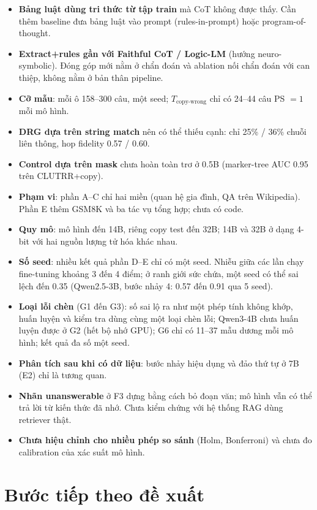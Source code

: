 \documentclass[11pt]{article}
\begin{document}
\begin{itemize}[leftmargin=*,itemsep=1pt]
\item \textbf{Bảng luật dùng tri thức từ tập train} mà CoT không được thấy. Cần thêm baseline đưa
  bảng luật vào prompt (rules-in-prompt) hoặc program-of-thought.
\item \textbf{Extract+rules gần với Faithful CoT / Logic-LM} (hướng neuro-symbolic). Đóng góp mới
  nằm ở chẩn đoán và ablation nối chẩn đoán với can thiệp, không nằm ở bản thân pipeline.
\item \textbf{Cỡ mẫu}: mỗi ô 158--300 câu, một seed; $T_{\text{copy-wrong}}$ chỉ có 24--44 câu PS
  $=1$ mỗi mô hình.
\item \textbf{DRG dựa trên string match} nên có thể thiếu cạnh: chỉ 25\% / 36\% chuỗi liên thông,
  hop fidelity 0.57 / 0.60.
\item \textbf{Control dựa trên mask} chưa hoàn toàn trơ ở 0.5B (marker-tree AUC 0.95 trên CLUTRR+copy).
\item \textbf{Phạm vi}: phần A--C chỉ hai miền (quan hệ gia đình, QA trên Wikipedia). Phần E thêm GSM8K và
  ba tác vụ tổng hợp; chưa có code.
\item \textbf{Quy mô}: mô hình đến 14B, riêng copy test đến 32B; 14B và 32B ở dạng 4-bit với hai nguồn
  lượng tử hóa khác nhau.
\item \textbf{Số seed}: nhiều kết quả phần D--E chỉ có một seed. Nhiễu giữa các lần chạy fine-tuning khoảng
  3 đến 4 điểm; ở ranh giới sức chứa, một seed có thể sai lệch đến 0.35 (Qwen2.5-3B, bước nhảy 4: 0.57 đến
  0.91 qua 5 seed).
\item \textbf{Loại lỗi chèn} (G1 đến G3): số sai lộ ra như một phép tính không khớp, huấn luyện và kiểm tra dùng cùng
  một loại chèn lỗi; Qwen3-4B chưa huấn luyện được ở G2 (hết bộ nhớ GPU); G6 chỉ có 11--37 mẫu dương mỗi mô hình; kết quả đa số một seed.
\item \textbf{Phân tích sau khi có dữ liệu}: bước nhảy hiệu dụng và đảo thứ tự ở 7B (E2) chỉ là tương quan.
\item \textbf{Nhãn unanswerable} ở F3 dựng bằng cách bỏ đoạn văn; mô hình vẫn có thể trả lời từ kiến thức
  đã nhớ. Chưa kiểm chứng với hệ thống RAG dùng retriever thật.
\item \textbf{Chưa hiệu chỉnh cho nhiều phép so sánh} (Holm, Bonferroni) và chưa đo calibration của xác
  suất mô hình.
\end{itemize}

\section{Bước tiếp theo đề xuất}
\end{document}
